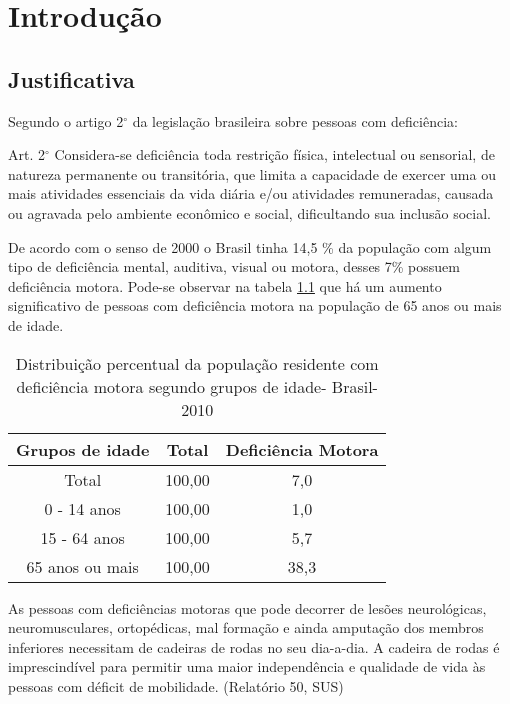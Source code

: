 \chapter[Introdução]{Introdução}

\section{Justificativa}
Segundo o artigo 2$^{\circ}$ da legislação brasileira sobre pessoas com deficiência:
\begin{citacao}
Art. 2$^{\circ}$ Considera-se deficiência toda restrição física, intelectual ou sensorial, de natureza permanente ou transitória, que limita a capacidade de exercer uma ou mais atividades essenciais da vida diária e/ou atividades remuneradas, causada ou agravada pelo ambiente econômico e social, dificultando sua inclusão social.
\end{citacao}
  
De acordo com o senso de 2000 o Brasil tinha 14,5 \% da população com algum tipo de deficiência mental, auditiva, visual ou motora, desses 7\% possuem deficiência motora.  Pode-se observar na tabela \ref{tab:ibge} que há um aumento significativo de pessoas com deficiência motora na população de 65 anos ou mais de idade.

\begin{table}[ht!]
\centering
\caption{Distribuição percentual da população residente com deficiência motora segundo grupos de idade- Brasil-2010}
\begin{tabular}{|c|c|c|}
\hline
Grupos de idade & Total  & Deficiência Motora \\ \hline

Total           & 100,00 & 7,0                \\ \hline
0 - 14 anos       & 100,00 & 1,0                \\ \hline
15 - 64 anos    & 100,00 & 5,7                \\ \hline
65 anos ou mais & 100,00 & 38,3              \\ \hline

\end{tabular}
\label{tab:ibge}
\end{table}

As pessoas com deficiências motoras que pode decorrer de lesões neurológicas, neuromusculares, ortopédicas, mal formação e ainda amputação dos membros inferiores necessitam de cadeiras de rodas no seu dia-a-dia. A cadeira de rodas é imprescindível para permitir uma maior independência e qualidade de vida às pessoas com déficit de mobilidade. (Relatório 50, SUS)

